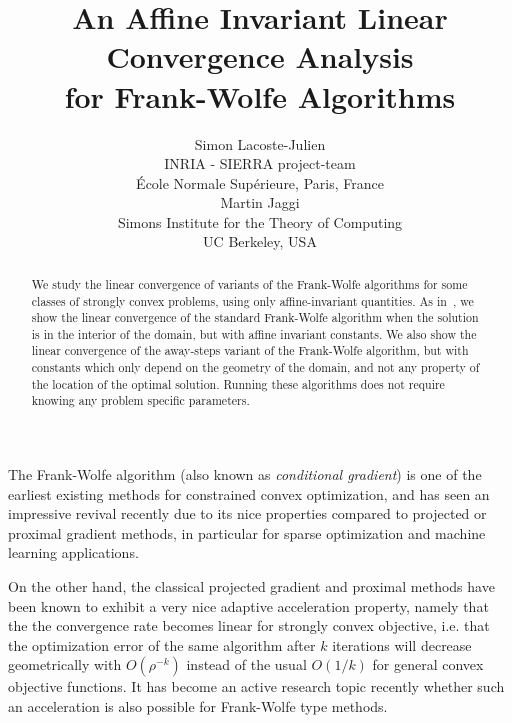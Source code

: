\documentclass{article} %
\title{An Affine Invariant Linear Convergence Analysis\\ for Frank-Wolfe Algorithms}
\author{
Simon Lacoste-Julien \\
INRIA - SIERRA project-team\\
{\'E}cole Normale Sup{\'e}rieure, Paris, France \\
\And
Martin Jaggi \\
Simons Institute for the Theory of Computing \\
UC Berkeley, USA \\
}
\newcommand{\0}{\mathbf{0}} %
\begin{document}
\maketitle
\vspace{-2mm}

\begin{abstract}\vspace{-2mm}
%
We study the linear convergence of variants of the Frank-Wolfe algorithms for some classes of strongly convex problems, using only affine-invariant quantities. 
As in~\cite{Guelat:1986fq}, we show the linear convergence of the standard Frank-Wolfe algorithm when the solution is in the interior of the domain, but with affine invariant constants. We also show the linear convergence of the away-steps variant of the Frank-Wolfe algorithm, but with constants which only depend on the geometry of the domain, and not any property of the location of the optimal solution.
Running these algorithms does not require knowing any problem specific parameters.
%
%
\end{abstract}

The Frank-Wolfe algorithm \cite{Frank:1956vp} (also known as \emph{conditional gradient}) is one of the earliest existing methods for constrained convex optimization, and has seen an impressive revival recently due to its nice properties compared to projected or proximal gradient methods, in particular for sparse optimization and machine learning applications.

On the other hand, the classical projected gradient and proximal methods have been known to exhibit a very nice adaptive acceleration property, 
namely that the the convergence rate becomes linear for strongly convex objective, i.e. that  the optimization error of the same algorithm after $k$ iterations will decrease geometrically with $O(\rho^{-k})$ instead of the usual $O(1/k)$ for general convex objective functions.
It has become an active research topic recently whether such an acceleration is also possible for Frank-Wolfe type methods.
%
%
%

\vspace{-2mm}
\end{document}
